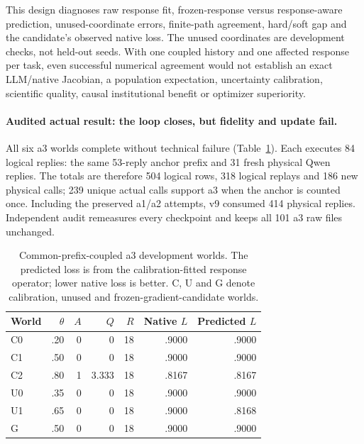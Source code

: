 This design diagnoses raw response fit, frozen-response versus response-aware
prediction, unused-coordinate errors, finite-path agreement, hard/soft gap and
the candidate's observed native loss.  The unused coordinates are development
checks, not held-out seeds.  With one coupled history and one affected response
per task, even successful numerical agreement would not establish an exact
LLM/native Jacobian, a population expectation, uncertainty calibration,
scientific quality, causal institutional benefit or optimizer superiority.

\paragraph{Audited actual result: the loop closes, but fidelity and update fail.}
All six a3 worlds complete without technical failure (Table~\ref{tab:native-qwen-v9}).
Each executes 84 logical replies: the same 53-reply anchor prefix and 31 fresh
physical Qwen replies.  The totals are therefore 504 logical rows, 318 logical
replays and 186 new physical calls; 239 unique actual calls support a3 when the
anchor is counted once.  Including the preserved a1/a2 attempts, v9 consumed
414 physical replies.  Independent audit remeasures every checkpoint and keeps
all 101 a3 raw files unchanged.

\begin{table}[t]
\caption{Common-prefix-coupled a3 development worlds.  The predicted loss is
from the calibration-fitted response operator; lower native loss is better.
C, U and G denote calibration, unused and frozen-gradient-candidate worlds.}
\label{tab:native-qwen-v9}
\centering
\scriptsize
\begin{tabular}{lrrrrrr}
\toprule
World & $\theta$ & $A$ & $Q$ & $R$ & Native $L$ & Predicted $L$ \\
\midrule
C0 & .20 & 0 & 0     & 18 & .9000 & .9000 \\
C1 & .50 & 0 & 0     & 18 & .9000 & .9000 \\
C2 & .80 & 1 & 3.333 & 18 & .8167 & .8167 \\
U0 & .35 & 0 & 0     & 18 & .9000 & .9000 \\
U1 & .65 & 0 & 0     & 18 & .9000 & .8168 \\
G  & .50 & 0 & 0     & 18 & .9000 & .9000 \\
\bottomrule
\end{tabular}
\end{table}

